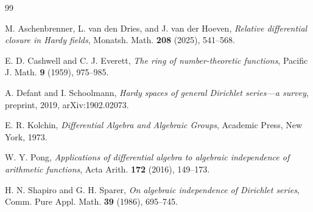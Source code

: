 \documentclass[11pt]{article}
\theoremstyle{definition}
\theoremstyle{remark}
\begin{document}
\begin{thebibliography}{99}

M. Aschenbrenner, L. van den Dries, and J. van der Hoeven,
\emph{Relative differential closure in Hardy fields},
Monatsh. Math. \textbf{208} (2025), 541--568.

E. D. Cashwell and C. J. Everett,
\emph{The ring of number-theoretic functions},
Pacific J. Math. \textbf{9} (1959), 975--985.

A. Defant and I. Schoolmann,
\emph{Hardy spaces of general Dirichlet series---a survey},
preprint, 2019, arXiv:1902.02073.

E. R. Kolchin,
\emph{Differential Algebra and Algebraic Groups},
Academic Press, New York, 1973.

W. Y. Pong,
\emph{Applications of differential algebra to algebraic independence of arithmetic functions},
Acta Arith. \textbf{172} (2016), 149--173.

H. N. Shapiro and G. H. Sparer,
\emph{On algebraic independence of Dirichlet series},
Comm. Pure Appl. Math. \textbf{39} (1986), 695--745.

\end{thebibliography}
\end{document}
